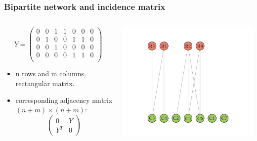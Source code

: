 \documentclass[compress,10pt]{beamer}
\begin{document}
\begin{frame}
\frametitle{Bipartite network and incidence matrix}
 \begin{columns}
 \begin{column}{.45\paperwidth}
$$Y=\left(
\begin{array}{rrrrrrr}
0 &   0 &   1 &   1 &   0 &   0 &   0 \\ 
   0 &   1 &   0 &   0 &   1 &   1 &   0 \\ 
   0 &   0 &   1 &   0 &   0 &   0 &   0 \\ 
  0 &   0 &   0 &   0 &   1 &   1 &   0 \\ 
\end{array}\right)
$$


\begin{itemize}
 \item n rows and m columns, rectangular matrix.
 \item corresponding adjacency matrix $(n+m)\times(n+m)$:
 $$
 \left(
 \begin{array}{rr}
  0 & Y\\
  Y^T & 0
 \end{array}
 \right)
 $$
\end{itemize}



\end{column}

\begin{column}{.5\paperwidth}

\includegraphics[scale=.5]{plots/graphe_bipartite.png}

\end{column}

\end{columns}



\end{frame}
\end{document}
